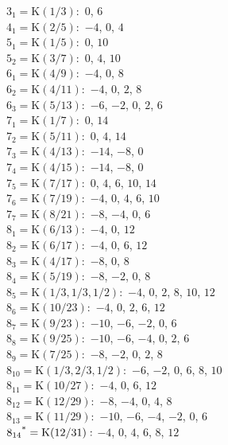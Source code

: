 $3_{1} = \mathrm{K}(1/3):$  $0$, $6$\\ 
$4_{1} = \mathrm{K}(2/5):$  $-4$, $0$, $4$\\ 
$5_{1} = \mathrm{K}(1/5):$  $0$, $10$\\ 
$5_{2} = \mathrm{K}(3/7):$  $0$, $4$, $10$\\ 
$6_{1} = \mathrm{K}(4/9):$  $-4$, $0$, $8$\\ 
$6_{2} = \mathrm{K}(4/11):$  $-4$, $0$, $2$, $8$\\ 
$6_{3} = \mathrm{K}(5/13):$  $-6$, $-2$, $0$, $2$, $6$\\ 
$7_{1} = \mathrm{K}(1/7):$  $0$, $14$\\ 
$7_{2} = \mathrm{K}(5/11):$  $0$, $4$, $14$\\ 
$7_{3} = \mathrm{K}(4/13):$  $-14$, $-8$, $0$\\ 
$7_{4} = \mathrm{K}(4/15):$  $-14$, $-8$, $0$\\ 
$7_{5} = \mathrm{K}(7/17):$  $0$, $4$, $6$, $10$, $14$\\ 
$7_{6} = \mathrm{K}(7/19):$  $-4$, $0$, $4$, $6$, $10$\\ 
$7_{7} = \mathrm{K}(8/21):$  $-8$, $-4$, $0$, $6$\\ 
$8_{1} = \mathrm{K}(6/13):$  $-4$, $0$, $12$\\ 
$8_{2} = \mathrm{K}(6/17):$  $-4$, $0$, $6$, $12$\\ 
$8_{3} = \mathrm{K}(4/17):$  $-8$, $0$, $8$\\ 
$8_{4} = \mathrm{K}(5/19):$  $-8$, $-2$, $0$, $8$\\ 
$8_{5} = \mathrm{K}(1/3, 1/3, 1/2):$  $-4$, $0$, $2$, $8$, $10$, $12$\\ 
$8_{6} = \mathrm{K}(10/23):$  $-4$, $0$, $2$, $6$, $12$\\ 
$8_{7} = \mathrm{K}(9/23):$  $-10$, $-6$, $-2$, $0$, $6$\\ 
$8_{8} = \mathrm{K}(9/25):$  $-10$, $-6$, $-4$, $0$, $2$, $6$\\ 
$8_{9} = \mathrm{K}(7/25):$  $-8$, $-2$, $0$, $2$, $8$\\ 
$8_{10} = \mathrm{K}(1/3, 2/3, 1/2):$  $-6$, $-2$, $0$, $6$, $8$, $10$\\ 
$8_{11} = \mathrm{K}(10/27):$  $-4$, $0$, $6$, $12$\\ 
$8_{12} = \mathrm{K}(12/29):$  $-8$, $-4$, $0$, $4$, $8$\\ 
$8_{13} = \mathrm{K}(11/29):$  $-10$, $-6$, $-4$, $-2$, $0$, $6$\\ 
$8_{14}\textsuperscript{*} = \mathrm{K}(12/31):$  $-4$, $0$, $4$, $6$, $8$, $12$\\ 
